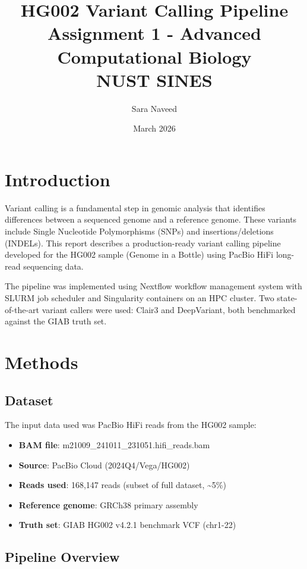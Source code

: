 \documentclass[12pt,a4paper]{article}
\title{
    \vspace{-1cm}
    \Large \textbf{HG002 Variant Calling Pipeline} \\
    \large Assignment 1 - Advanced Computational Biology \\
    \normalsize NUST SINES
}
\author{Sara Naveed}
\date{March 2026}
\begin{document}
\maketitle
\thispagestyle{fancy}

\section{Introduction}

Variant calling is a fundamental step in genomic analysis that identifies differences between a sequenced genome and a reference genome. These variants include Single Nucleotide Polymorphisms (SNPs) and insertions/deletions (INDELs). This report describes a production-ready variant calling pipeline developed for the HG002 sample (Genome in a Bottle) using PacBio HiFi long-read sequencing data.

The pipeline was implemented using Nextflow workflow management system with SLURM job scheduler and Singularity containers on an HPC cluster. Two state-of-the-art variant callers were used: Clair3 and DeepVariant, both benchmarked against the GIAB truth set.

\section{Methods}

\subsection{Dataset}
The input data used was PacBio HiFi reads from the HG002 sample:
\begin{itemize}
    \item \textbf{BAM file}: m21009\_241011\_231051.hifi\_reads.bam
    \item \textbf{Source}: PacBio Cloud (2024Q4/Vega/HG002)
    \item \textbf{Reads used}: 168,147 reads (subset of full dataset, \textasciitilde5\%)
    \item \textbf{Reference genome}: GRCh38 primary assembly
    \item \textbf{Truth set}: GIAB HG002 v4.2.1 benchmark VCF (chr1-22)
\end{itemize}

\subsection{Pipeline Overview}
\end{document}
